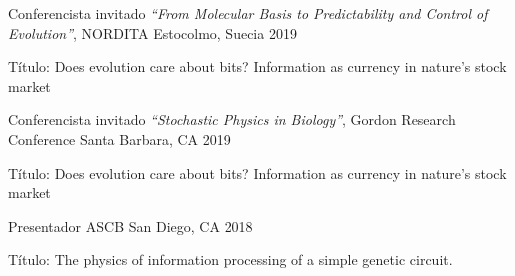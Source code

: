 
\begin{cventries}

  \cventry
    {Conferencista invitado} %
    {\textit{``From Molecular Basis to Predictability and Control of
    Evolution''}, NORDITA} %
    {Estocolmo, Suecia} %
    {2019} %
    {
      \begin{cvitems} %
        \item {Título: Does evolution care about bits? Information as currency 
        in nature's stock market}
      \end{cvitems}
    }
  \cventry
    {Conferencista invitado} %
    {\textit{``Stochastic Physics in Biology''}, Gordon Research Conference}
    {Santa Barbara, CA} %
    {2019} %
    {
      \begin{cvitems} %
        \item {Título: Does evolution care about bits? Information as currency 
        in nature's stock market}
      \end{cvitems}
    }

\end{cventries}



\begin{cventries}
  \cventry
    {Presentador} %
    {ASCB} %
    {San Diego, CA} %
    {2018} %
    {
      \begin{cvitems} %
        \item {Título: The physics of information processing of a simple 
        genetic circuit.}
      \end{cvitems}
    }
  
\end{cventries}
